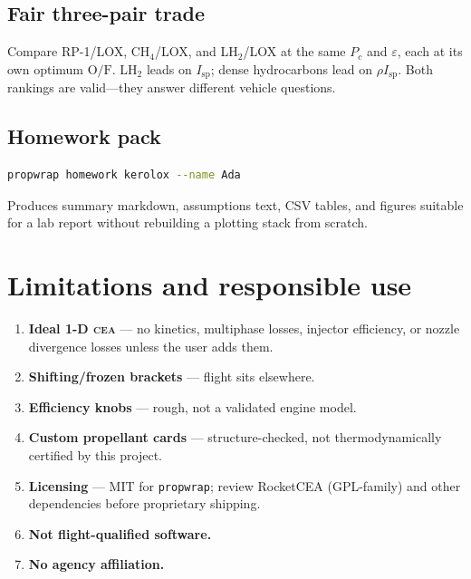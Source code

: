 \documentclass[11pt,a4paper]{report}
\newcommand{\pw}{\texttt{propwrap}}
\newcommand{\cea}{\textsc{cea}}
\newcommand{\of}{\mathrm{O/F}}
\newcommand{\Isp}{I_{\mathrm{sp}}}
\newcommand{\Pc}{P_{c}}
\newcommand{\eps}{\varepsilon}
\begin{document}
\section{Fair three-pair trade}

Compare RP-1/LOX, CH$_4$/LOX, and LH$_2$/LOX at the same $\Pc$ and $\eps$, each
at its own optimum $\of$. LH$_2$ leads on $\Isp$; dense hydrocarbons lead on
$\rho\Isp$. Both rankings are valid---they answer different vehicle questions.

\section{Homework pack}

\begin{lstlisting}[language=bash]
propwrap homework kerolox --name Ada
\end{lstlisting}
Produces summary markdown, assumptions text, CSV tables, and figures suitable
for a lab report without rebuilding a plotting stack from scratch.

\chapter{Limitations and responsible use}
\label{ch:limits}

\begin{enumerate}[leftmargin=*]
  \item \textbf{Ideal 1-D \cea{}} --- no kinetics, multiphase losses, injector
        efficiency, or nozzle divergence losses unless the user adds them.
  \item \textbf{Shifting/frozen brackets} --- flight sits elsewhere.
  \item \textbf{Efficiency knobs} --- rough, not a validated engine model.
  \item \textbf{Custom propellant cards} --- structure-checked, not
        thermodynamically certified by this project.
  \item \textbf{Licensing} --- MIT for \pw{}; review RocketCEA (GPL-family) and
        other dependencies before proprietary shipping.
  \item \textbf{Not flight-qualified software.}
  \item \textbf{No agency affiliation.}
\end{enumerate}
\end{document}
